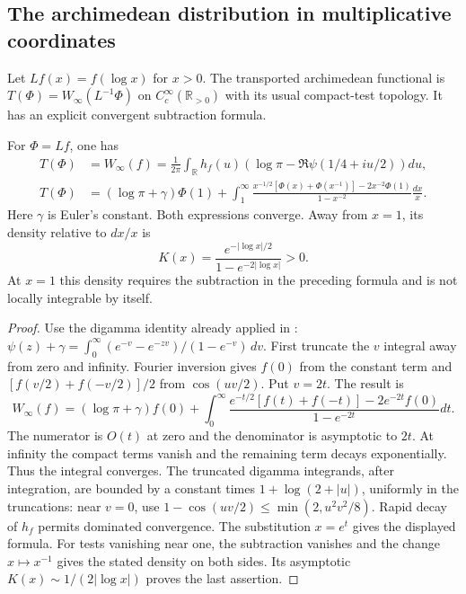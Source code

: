 \subsection{The archimedean distribution in multiplicative coordinates}
\label{v4-arith:w7-i:burnol:dual-kernel}

Let $Lf(x)=f(\log x)$ for $x>0$. The transported archimedean
functional is $T(\Phi)=W_\infty(L^{-1}\Phi)$ on
$C_c^\infty(\mathbb R_{>0})$ with its usual compact-test topology.
It has an explicit convergent subtraction formula.

\begin{proposition}
\label{v4-arith:w7-i:prop:dual-kernel}
For $\Phi=Lf$, one has
\begin{align}
 T(\Phi)&=W_\infty(f)
 =\frac1{2\pi}\int_{\mathbb R}h_f(u)
     (\log\pi-\Re\psi(1/4+iu/2))du,
 \label{v4-arith:w7-i:eq:guinand-arch-recall}\\
 T(\Phi)&=(\log\pi+\gamma)\Phi(1)
 +\int_1^\infty
 \frac{x^{-1/2}[\Phi(x)+\Phi(x^{-1})]-2x^{-2}\Phi(1)}
      {1-x^{-2}}\frac{dx}{x}.
 \label{v4-arith:w7-i:eq:dual-kernel}
\end{align}
Here $\gamma$ is Euler's constant. Both expressions converge.
Away from $x=1$, its density relative to $dx/x$ is
\begin{equation}
\label{v4-arith:w7-i:eq:tilde-g}
 K(x)=\frac{e^{-|\log x|/2}}{1-e^{-2|\log x|}}>0.
\end{equation}
At $x=1$ this density requires the subtraction in the preceding
formula and is not locally integrable by itself.
\end{proposition}
\begin{proof}
Use the digamma identity already applied in
:
$\psi(z)+\gamma=\int_0^\infty(e^{-v}-e^{-zv})/(1-e^{-v})\,dv$.
First truncate the $v$ integral away from zero and infinity.
Fourier inversion gives $f(0)$ from the constant term and
$[f(v/2)+f(-v/2)]/2$ from $\cos(uv/2)$.
Put $v=2t$. The result is
\[
 W_\infty(f)=(\log\pi+\gamma)f(0)
 +\int_0^\infty
 \frac{e^{-t/2}[f(t)+f(-t)]-2e^{-2t}f(0)}{1-e^{-2t}}dt.
\]
The numerator is $O(t)$ at zero and the denominator is asymptotic
to $2t$. At infinity the compact terms vanish and the remaining
term decays exponentially. Thus the integral converges.
The truncated digamma integrands, after integration, are bounded
by a constant times $1+\log(2+|u|)$, uniformly in the truncations:
near $v=0$, use $1-\cos(uv/2)\le\min(2,u^2v^2/8)$.
Rapid decay of $h_f$ permits dominated convergence.
The substitution $x=e^t$ gives the displayed formula.
For tests vanishing near one, the subtraction vanishes and the
change $x\mapsto x^{-1}$ gives the stated density on both sides.
Its asymptotic $K(x)\sim1/(2|\log x|)$ proves the last assertion.
\end{proof}

